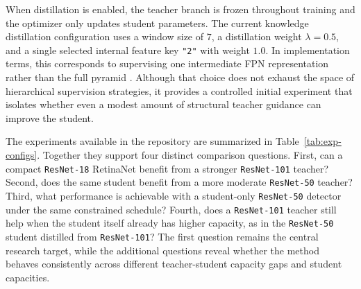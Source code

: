 When distillation is enabled, the teacher branch is frozen throughout training and the optimizer only updates student parameters. The current knowledge distillation configuration uses a window size of $7$, a distillation weight $\lambda=0.5$, and a single selected internal feature key \texttt{"2"} with weight $1.0$. In implementation terms, this corresponds to supervising one intermediate FPN representation rather than the full pyramid \cite{lin2017fpn,derijk2022structural}. Although that choice does not exhaust the space of hierarchical supervision strategies, it provides a controlled initial experiment that isolates whether even a modest amount of structural teacher guidance can improve the student.

The experiments available in the repository are summarized in Table~\ref{tab:exp-configs}. Together they support four distinct comparison questions. First, can a compact \texttt{ResNet-18} RetinaNet benefit from a stronger \texttt{ResNet-101} teacher? Second, does the same student benefit from a more moderate \texttt{ResNet-50} teacher? Third, what performance is achievable with a student-only \texttt{ResNet-50} detector under the same constrained schedule? Fourth, does a \texttt{ResNet-101} teacher still help when the student itself already has higher capacity, as in the \texttt{ResNet-50} student distilled from \texttt{ResNet-101}? The first question remains the central research target, while the additional questions reveal whether the method behaves consistently across different teacher-student capacity gaps and student capacities.

\begin{table}[t]
\centering
\small
{}
\caption{Experiment configurations recovered from the repository \texttt{json} files and saved run records. All runs use AdamW, batch size $6$, $10$ epochs, per-epoch subset sampling with ratio $0.3$, and COCO evaluation every epoch.}
\label{tab:exp-configs}
\end{table}


